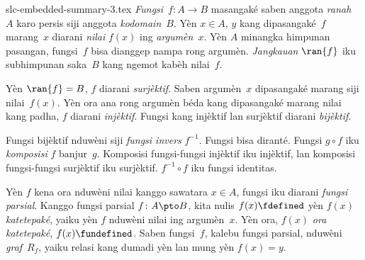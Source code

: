 \begin{filecontents*}[overwrite]{slc-embedded-summary-3.tex}
\emph{Fungsi}~$f\colon A\to B$ masangaké saben anggota
\emph{ranah}~$A$ karo persis siji anggota \emph{kodomain}~$B$.
Yèn $x\in A$, $y$ kang dipasangaké~$f$ marang~$x$ diarani
\emph{nilai} $f(x)$ ing \emph{argumèn}~$x$. Yèn $A$ minangka
himpunan pasangan, fungsi~$f$ bisa dianggep nampa rong argumèn.
\emph{Jangkauan} $\ran{f}$ iku subhimpunan saka~$B$ kang
ngemot kabèh nilai~$f$.

Yèn $\ran{f}=B$, $f$ diarani \emph{surjèktif}. Saben
argumèn~$x$ dipasangaké marang siji nilai~$f(x)$. Yèn ora ana
rong argumèn béda kang dipasangaké marang nilai kang padha,
$f$ diarani \emph{injèktif}. Fungsi kang injèktif lan surjèktif
diarani \emph{bijèktif}.

Fungsi bijèktif nduwèni siji \emph{fungsi invers} $f^{-1}$.
Fungsi bisa diranté. Fungsi $g\circ f$ iku \emph{komposisi}
$f$ banjur~$g$. Komposisi fungsi-fungsi injèktif iku injèktif,
lan komposisi fungsi-fungsi surjèktif iku surjèktif.
$f^{-1}\circ f$ iku fungsi identitas.

Yèn $f$ kena ora nduwèni nilai kanggo sawatara $x\in A$,
fungsi iku diarani \emph{fungsi parsial}. Kanggo fungsi
parsial $f\colon A\pto B$, kita nulis $f(x)\fdefined$ yèn
$f(x)$ \emph{katetepaké}, yaiku yèn $f$ nduwèni nilai ing
argumèn~$x$. Yèn ora, $f(x)$ \emph{ora katetepaké},
$f(x)\fundefined$. Saben fungsi~$f$, kalebu fungsi parsial,
nduwèni \emph{graf}~$R_f$, yaiku relasi kang dumadi yèn lan
mung yèn $f(x)=y$.
\end{filecontents*}

